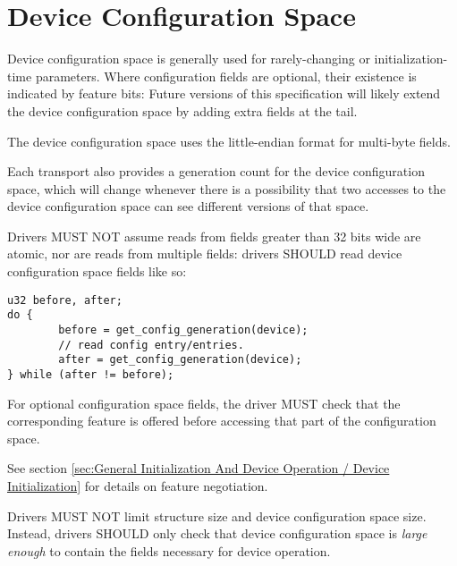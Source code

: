 \section{Device Configuration Space}\label{sec:Basic Facilities of a Virtio Device / Device Configuration Space}

Device configuration space is generally used for rarely-changing or
initialization-time parameters.  Where configuration fields are
optional, their existence is indicated by feature bits: Future
versions of this specification will likely extend the device
configuration space by adding extra fields at the tail.

\begin{note}
The device configuration space uses the little-endian format
for multi-byte fields.
\end{note}

Each transport also provides a generation count for the device configuration
space, which will change whenever there is a possibility that two
accesses to the device configuration space can see different versions of that
space.

Drivers MUST NOT assume reads from
fields greater than 32 bits wide are atomic, nor are reads from
multiple fields: drivers SHOULD read device configuration space fields like so:

\begin{lstlisting}
u32 before, after;
do {
        before = get_config_generation(device);
        // read config entry/entries.
        after = get_config_generation(device);
} while (after != before);
\end{lstlisting}

For optional configuration space fields, the driver MUST check that the
corresponding feature is offered before accessing that part of the configuration
space.
\begin{note}
See section \ref{sec:General Initialization And Device Operation / Device Initialization} for details on feature negotiation.
\end{note}

Drivers MUST
NOT limit structure size and device configuration space size.  Instead,
drivers SHOULD only check that device configuration space is {\em large enough} to
contain the fields necessary for device operation.

